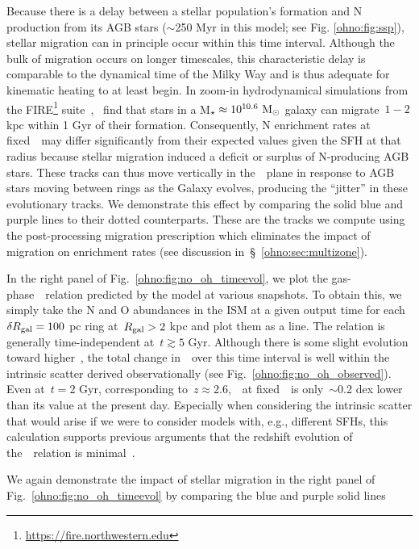 Because there is a delay between a stellar population's formation and N
production from its AGB stars ($\sim$250 Myr in this model; see Fig.
\ref{ohno:fig:ssp}), stellar migration can in principle occur within this time
interval.
Although the bulk of migration occurs on longer timescales, this characteristic
delay is comparable to the dynamical time of the Milky Way and is thus adequate
for kinematic heating to at least begin.
In zoom-in hydrodynamical simulations from the FIRE\footnote{
	\url{https://fire.northwestern.edu}
} suite~\citep{Hopkins2014},~\citet{El-Badry2016} find that stars in a
M$_\star \approx 10^{10.6}~\text{M}_\odot$ galaxy can migrate~$1 - 2$ kpc within 1 Gyr
of their formation.
Consequently, N enrichment rates at fixed~\rgal~may differ significantly from
their expected values given the SFH at that radius because stellar migration
induced a deficit or surplus of N-producing AGB stars.
These tracks can thus move vertically in the~\ohno~plane in response to AGB
stars moving between rings as the Galaxy evolves, producing the ``jitter'' in
these evolutionary tracks.
We demonstrate this effect by comparing the solid blue and purple lines to
their dotted counterparts.
These are the tracks we compute using the post-processing migration
prescription which eliminates the impact of migration on enrichment rates (see
discussion in~\S~\ref{ohno:sec:multizone}).
\par
In the right panel of Fig.~\ref{ohno:fig:no_oh_timeevol}, we plot the
gas-phase~\ohno~relation predicted by the model at various snapshots.
To obtain this, we simply take the N and O abundances in the ISM at a given
output time for each~$\delta R_\text{gal} = 100$ pc ring at~$R_\text{gal} > 2$ kpc and plot
them as a line.
The relation is generally time-independent at~$t \gtrsim 5$ Gyr.
Although there is some slight evolution toward higher~\no, the total change
in~\no~over this time interval is well within the intrinsic scatter derived
observationally (see Fig.~\ref{ohno:fig:no_oh_observed}).
Even at~$t = 2$ Gyr, corresponding to~$z \approx 2.6$,~\no~at fixed~\oh~is
only~$\sim$0.2 dex lower than its value at the present day.
Especially when considering the intrinsic scatter that would arise if we were
to consider models with, e.g., different SFHs, this calculation supports
previous arguments that the redshift evolution of the~\ohno~relation is
minimal~\citep{Vincenzo2018, HaydenPawson2022}.
\par
We again demonstrate the impact of stellar migration in the right panel of
Fig.~\ref{ohno:fig:no_oh_timeevol} by comparing the blue and purple solid lines
